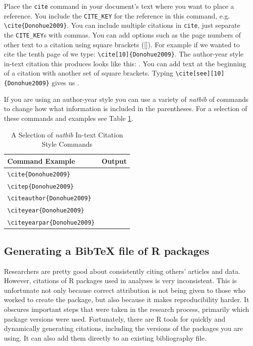 Place the \texttt{cite} command in your document's text where you want to place a reference. You include the \verb|CITE_KEY| for the reference in this command, e.g. \verb|\cite{Donohue2009}|. You can include multiple citations in \texttt{cite}, just separate the \verb|CITE_KEY|s with commas. You can add options such as the page numbers of other text to a citation using square brackets ([]). For example if we wanted to cite the tenth page of \cite{Donohue2009} we type: \verb|\cite[10]{Donohue2009}|. The author-year style in-text citation this produces looks like this: \cite[10]{Donohue2009}. You can add text at the beginning of a citation with another set of square brackets. Typing \verb|\cite[see][10]{Donohue2009}| gives us \cite[see][10]{Donohue2009}.

If you are using an author-year style you can use a variety of \emph{natbib} of commands to change how what information is included in the parentheses. For a selection of these commands and examples see Table \ref{NatbibTable}.

\begin{table}
    \caption{A Selection of \emph{natbib} In-text Citation Style Commands}
    \label{NatbibTable}
        \begin{center}
            \begin{tabular}{l r}
                \hline
                Command Example & Output \\[0.25cm]
                \hline\hline
                \verb|\cite{Donohue2009}| & \cite{Donohue2009} \\
                \verb|\citep{Donohue2009}| & \citep{Donohue2009} \\
                \verb|\citeauthor{Donohue2009}| & \citeauthor{Donohue2009} \\
                \verb|\citeyear{Donohue2009}| & \citeyear{Donohue2009} \\
                \verb|\citeyearpar{Donohue2009}| & \citeyearpar{Donohue2009} \\
                \hline
            \end{tabular}
        \end{center}
\end{table}

\subsection{Generating a BibTeX file of R packages}

Researchers are pretty good about consistently citing others' articles and data. However, citations of R packages used in analyses is very inconsistent. This is unfortunate not only because correct attribution is not being given to those who worked to create the package, but also because it makes reproducibility harder. It obscures important steps that were taken in the research process, primarily which package versions were used. Fortunately, there are R tools for quickly and dynamically generating citations, including the versions of the packages you are using. It can also add them directly to an existing bibliography file.

